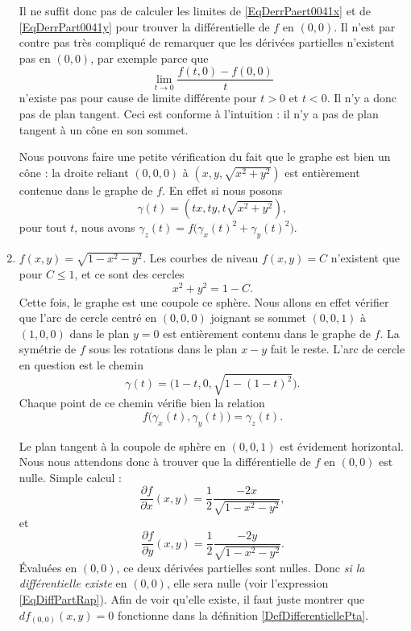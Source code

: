 \begin{example}
\begin{enumerate}
Il ne suffit donc pas de calculer les limites de \ref{EqDerrPaert0041x} et de \ref{EqDerrPart0041y} pour trouver la différentielle de $f$ en $(0,0)$. Il n'est par contre pas très compliqué de remarquer que les dérivées partielles n'existent pas en $(0,0)$, par exemple parce que
\begin{equation}
	\lim_{t\to 0}\frac{ f(t,0)-f(0,0) }{ t }
\end{equation}
n'existe pas pour cause de limite différente pour $t>0$ et $t<0$. Il n'y a donc pas de plan tangent.  Ceci est conforme à l'intuition : il n'y a pas de plan tangent à un cône en son sommet.

Nous pouvons faire une petite vérification du fait que le graphe est bien un cône : la droite reliant $(0,0,0)$ à $(x,y,\sqrt{x^2+y^2})$ est entièrement contenue dans le graphe de $f$. En effet si nous posons
\begin{equation}
	\gamma(t)=(tx,ty,t\sqrt{x^2+y^2}),
\end{equation}
pour tout $t$, nous avons $\gamma_z(t)=f\big( \gamma_x(t)^2+\gamma_y(t)^2 \big)$.



\item
$f(x,y)=\sqrt{1-x^2-y^2}$. Les courbes de niveau $f(x,y)=C$ n'existent que pour $C\leq 1$, et ce sont des cercles
\begin{equation}
	x^2+y^2=1-C.
\end{equation}
Cette fois, le graphe est une coupole ce sphère. Nous allons en effet vérifier que l'arc de cercle centré en $(0,0,0)$ joignant se sommet $(0,0,1)$ à $(1,0,0)$ dans le plan $y=0$ est entièrement contenu dans le graphe de $f$. La symétrie de $f$ sous les rotations dans le plan $x-y$ fait le reste. L'arc de cercle en question est le chemin
\begin{equation}
	\gamma(t)=\big( 1-t,0,\sqrt{1-(1-t)^2} \big).
\end{equation}
Chaque point de ce chemin vérifie bien la relation
\begin{equation}
	f\big( \gamma_x(t),\gamma_y(t) \big)=\gamma_z(t).
\end{equation}

Le plan tangent à la coupole de sphère en $(0,0,1)$ est évidement horizontal. Nous nous attendons donc à trouver que la différentielle de $f$ en $(0,0)$ est nulle. Simple calcul :
\begin{equation}
	\frac{ \partial f }{ \partial x }(x,y)=\frac{ 1 }{2}\frac{ -2x }{ \sqrt{1-x^2-y^2} },
\end{equation}
et 
\begin{equation}
	\frac{ \partial f }{ \partial y }(x,y)=\frac{ 1 }{2}\frac{ -2y }{ \sqrt{1-x^2-y^2} }.
\end{equation}
Évaluées en $(0,0)$, ce deux dérivées partielles sont nulles. Donc \emph{si la différentielle existe} en $(0,0)$, elle sera nulle (voir l'expression \eqref{EqDiffPartRap}). Afin de voir qu'elle existe, il faut juste montrer que $df_{(0,0)}(x,y)=0$ fonctionne dans la définition \ref{DefDifferentiellePta}.


\end{enumerate}
\end{example}
